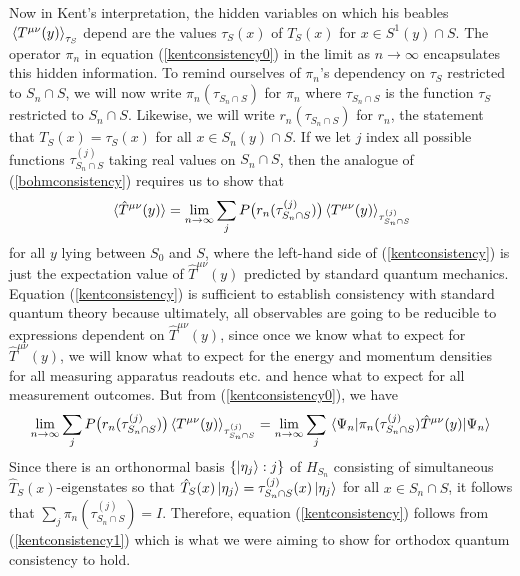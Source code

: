 Now in Kent's interpretation, the hidden variables on which his beables $\ev*{T^{\mu\nu}(y)}_{\tau_S}$ depend are the values $\tau_S(x)$ of $T_S(x)$ for $x\in S^1(y)\cap S$. The operator $\pi_n$ in equation (\ref{kentconsistency0}) in the limit as $n\rightarrow\infty$ encapsulates this hidden information. To remind ourselves of $\pi_n$'s dependency on $\tau_S$ restricted to $S_n\cap S$, we will now write $\pi_n(\tau_{S_n\cap S})$ for $\pi_n$ where $\tau_{S_n\cap S}$ is the function $\tau_S$ restricted to $S_n\cap S$. Likewise, we will write  $r_n(\tau_{S_n\cap S})$ for $r_n$, the statement that $T_S(x)=\tau_S(x)$ for all $x\in S_n(y)\cap S$. If we let $j$ index all possible functions $\tau^{(j)}_{S_n\cap S}$ taking real values on $S_n\cap S$, then the analogue of (\ref{bohmconsistency}) requires us to show that 
\begin{equation}\label{kentconsistency}
\ev*{\hat{T}^{\mu\nu}(y)}=\lim_{n\rightarrow\infty}\sum_{j}P\big(r_n(\tau^{(j)}_{S_n\cap S})\big)\ev*{T^{\mu\nu}(y)}_{\tau^{(j)}_{S_n\cap S}}
\end{equation}
for all $y$ lying between $S_0$ and $S$, where the left-hand side of (\ref{kentconsistency}) is just the expectation value of $\hat{T}^{\mu\nu}(y)$ predicted by standard quantum mechanics. Equation (\ref{kentconsistency}) is sufficient to establish consistency with standard quantum theory because ultimately, all observables are going to be reducible to expressions dependent on $\hat{T}^{\mu\nu}(y)$, since once we know what to expect for $\hat{T}^{\mu\nu}(y)$, we will know what to expect for the energy and momentum densities for all measuring apparatus readouts etc. and hence what to expect for all measurement outcomes. But from (\ref{kentconsistency0}), we have 
\begin{equation}\label{kentconsistency1}
\lim_{n\rightarrow\infty}\sum_jP\big(r_n(\tau^{(j)}_{S_n\cap S})\big)\ev*{T^{\mu\nu}(y)}_{\tau^{(j)}_{S_n\cap S}}=\lim_{n\rightarrow\infty}\sum_{j}{\ev*{\pi_{n}(\tau^{(j)}_{S_n\cap S})\hat{T}^{\mu\nu}(y)}{\Psi_n}}
\end{equation}
Since there is an orthonormal basis $\{\ket{\eta_j}:j\}$ of $H_{S_n}$ consisting of simultaneous $\hat{T}_S(x)$-eigenstates so that $\hat{T}_S(x)\ket{\eta_j}=\tau^{(j)}_{S_n\cap S}(x)\ket{\eta_j}$ for all $x\in S_n\cap S$, it follows that $\sum_j \pi_{n}(\tau^{(j)}_{S_n\cap S})=I$. Therefore, equation (\ref{kentconsistency}) follows from (\ref{kentconsistency1}) which is what we were aiming to show for orthodox quantum consistency to hold.




